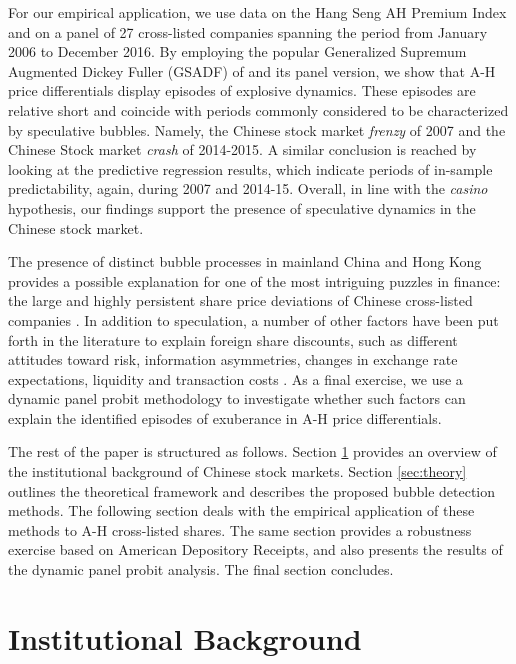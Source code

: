 \documentclass[11pt]{article}
\begin{document}
For our empirical application, we use data on the Hang Seng AH Premium Index and on a panel of 27 cross-listed companies spanning the period from January 2006 to December 2016. By employing the popular Generalized Supremum Augmented Dickey Fuller (GSADF) of \citet{PhillipsSY2015a,PhillipsSY2015b} and its panel version, we show that A-H price differentials display episodes of explosive dynamics. These episodes are relative short and coincide with periods commonly considered to be characterized by speculative bubbles. Namely, the Chinese stock market \textit{frenzy} of 2007 and the Chinese Stock market \textit{crash} of 2014-2015. A similar conclusion is reached by looking at the predictive regression results, which indicate periods of in-sample predictability, again, during 2007 and 2014-15. Overall, in line with the \textit{casino} hypothesis, our findings support the presence of speculative dynamics in the Chinese stock market.

The presence of distinct bubble processes in mainland China and Hong Kong provides a possible explanation for one of the most intriguing puzzles in finance: the large and highly persistent share price deviations of Chinese cross-listed companies \citep{fernaldR2002,carpenterW2017}. In addition to speculation, a number of other factors have been put forth in the literature to explain foreign share discounts, such as different attitudes toward risk, information asymmetries, changes in exchange rate expectations, liquidity and transaction costs \citep{wangJ2004,chanMY2008,chungHL2013}. As a final exercise, we use a dynamic panel probit methodology to investigate whether such factors can explain the identified episodes of exuberance in A-H price differentials. 

The rest of the paper is structured as follows. Section \ref{sec:instit} provides an overview of the institutional background of Chinese stock markets. Section \ref{sec:theory} outlines the theoretical framework and describes the proposed bubble detection methods. The following section deals with the empirical application of these methods to A-H cross-listed shares. The same section  provides a robustness exercise based on American Depository Receipts, and also presents the results of the dynamic panel probit analysis. The final section concludes.


\section{Institutional Background}\label{sec:instit}
\end{document}
